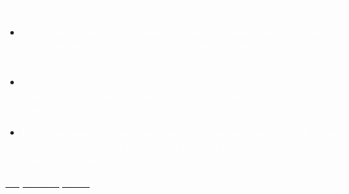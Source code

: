 \documentclass[t]{beamer}
\begin{document}
{
\begin{frame}[t]{\LARGE \textcolor{white}{\hfill Goals For This Fine Day\hfill}}

\Large
\begin{itemize}

\item[\textcolor{white}{\textbullet}] \textcolor{white}{I’ll explain the Assertion-Evidence structure of presentation slides, based on ideas developed by Michael Alley, a Teaching Professor of Engineering at Penn State University.}


\item[\textcolor{white}{\textbullet}] \textcolor{white}{He claims that the Assertion-Evidence structure leads to better student learning and retention compared to the bulleted lists found on typical PowerPoint slides.}


\item[\textcolor{white}{\textbullet}] \textcolor{white}{I’ll discuss some of the pros and cons of his structure because, while I think Alley’s ideas have merit (otherwise, I wouldn’t be talking about them), I think they can be improved.}
\end{itemize}

\tinyfill \href{https://www.flickr.com/photos/stuckincustoms/3428453770}{\textcolor{white}{Trey Ratcliff, Flickr, }}
\end{frame}
}

%

%


%

{
\begin{frame}[t]
\end{frame}
}

%

{
\begin{frame}[t]
\end{frame}
}
\end{document}
